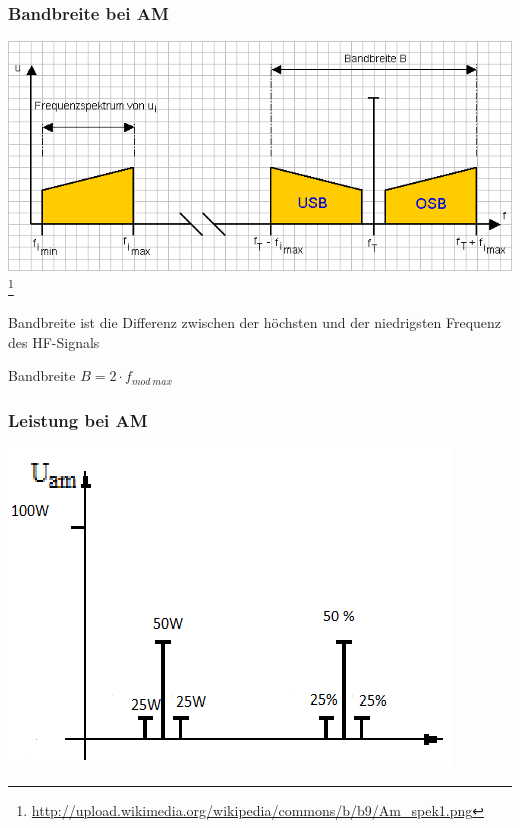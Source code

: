 \begin{frame}
\frametitle{Bandbreite bei AM}
\begin{center}
\includegraphics[scale=0.3]{e14/Bandbreite.png}
\footnote{\url{http://upload.wikimedia.org/wikipedia/commons/b/b9/Am_spek1.png}} \\
\end{center}
Bandbreite ist die Differenz zwischen der höchsten und der niedrigsten Frequenz des HF-Signals
\begin{block}{Bandbreite}
  {$B = 2 \cdot f_{mod~max}$}
\end{block}
\end{frame}

\begin{frame}
\frametitle{Leistung bei AM}
\includegraphics[scale=0.8]{e14/AMP.png}
\end{frame}

